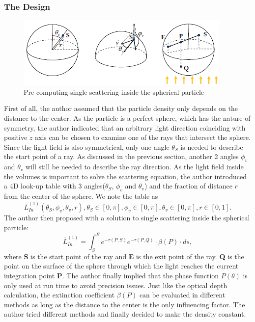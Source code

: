 \subsubsection{The Design}
\begin{figure}[htp]
\begin{center}
\includegraphics[scale=1.0]{images/singlescattering.png}
\caption{Pre-computing single scattering inside the spherical
particle}
\label{f11}
\end{center}
\end{figure}
First of all, the author assumed that the particle density only depends on the distance to the center. As the particle is a perfect sphere, which has the nature of symmetry, the author indicated that an arbitrary light direction coinciding with positive $z$ axis can be chosen to examine one of the rays that intersect the sphere. Since the light field is also symmetrical, only one angle $\theta_S$ is needed to describe the start point of a ray. As discussed in the previous section, another 2 angles $\phi_v$ and $\theta_v$ will still be needed to describe the ray direction. As the light field inside the volumes is important to solve the scattering equation, the author introduced a 4D look-up table with 3 angles($\theta_S$, $\phi_v$ and $\theta_v$) and the fraction of distance $r$ from the center of the sphere. We note the table as 
\begin{equation}
\bar{L}^{(1)}_{In}(\theta_S, \phi_v, \theta_v, r), \theta_S\in[0, \pi], \phi_v\in[0, \pi], \theta_v\in[0, \pi], r\in[0, 1].
\end{equation}
The author then proposed with a solution to single scattering inside the spherical particle:
\begin{equation}
\bar{L}^{(1)}_{In} = \int_{S}^{E}e^{-\tau(P,S)}e^{-\tau(P,Q)} \cdot \beta(P) \cdot ds,
\end{equation}
where \textbf{S} is the start point of the ray and \textbf{E} is the exit point of the ray. \textbf{Q} is the point on the surface of the sphere through which the light reaches the current integration point \textbf{P}. The author finally implied that the phase function $P(\theta)$ is only used at run time to avoid precision issues. Just like the optical depth calculation, the extinction coefficient $\beta(P)$ can be evaluated in different methods as long as the distance to the center is the only influencing factor. The author tried different methods and finally decided to make the density constant.

